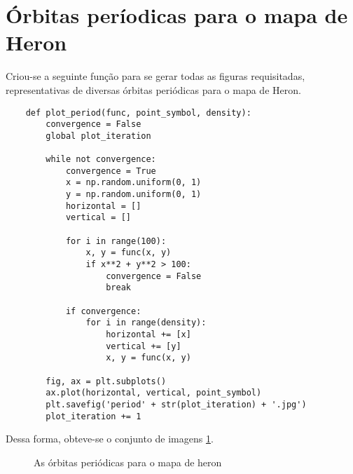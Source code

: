 \documentclass{article}[twocolumn]
\begin{document}
	\section{Órbitas períodicas para o mapa de Heron}
	Criou-se a seguinte função para se gerar todas as figuras requisitadas, representativas
	de diversas órbitas periódicas para o mapa de Heron.
	\begin{verbatim}
	def plot_period(func, point_symbol, density):
    	convergence = False
    	global plot_iteration
    
    	while not convergence:
        	convergence = True
        	x = np.random.uniform(0, 1)
        	y = np.random.uniform(0, 1)
        	horizontal = []
        	vertical = []
        		
        	for i in range(100):
            	x, y = func(x, y)
            	if x**2 + y**2 > 100:
                	convergence = False
                	break
        
        	if convergence:
            	for i in range(density):
                	horizontal += [x]
                	vertical += [y]
                	x, y = func(x, y)
    	
    	fig, ax = plt.subplots()
    	ax.plot(horizontal, vertical, point_symbol)
    	plt.savefig('period' + str(plot_iteration) + '.jpg')
    	plot_iteration += 1
	\end{verbatim}
	Dessa forma, obteve-se o conjunto de imagens \ref{fig:periods}.
	\begin{figure}[H]
		\centering
		\begin{subfigure} {
			\texttt{[image: period1.jpg]}
		} \end{subfigure}
		\begin{subfigure} {
			\texttt{[image: period2.jpg]}
		} \end{subfigure}
		\begin{subfigure} {
			\texttt{[image: period3.jpg]}
		} \end{subfigure}
		\begin{subfigure} {
			\texttt{[image: period4.jpg]}
		} \end{subfigure}
		\begin{subfigure} {
			\texttt{[image: period5.jpg]}
		} \end{subfigure}
		\begin{subfigure} {
			\texttt{[image: period6.jpg]}
		} \end{subfigure}
		\caption{As órbitas periódicas para o mapa de heron}
		\label{fig:periods}
	\end{figure}
\end{document}
